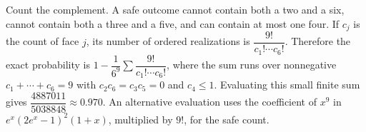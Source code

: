 Count the complement. A safe outcome cannot contain both a two and a six, cannot contain both a three and a five, and can contain at most one four. If $c_j$ is the count of face $j$, its number of ordered realizations is $\dfrac{9!}{c_1!\cdots c_6!}$. Therefore the exact probability is $1-\dfrac{1}{6^9}\sum\dfrac{9!}{c_1!\cdots c_6!}$, where the sum runs over nonnegative $c_1+\cdots+c_6=9$ with $c_2c_6=c_3c_5=0$ and $c_4\le1$. Evaluating this small finite sum gives $\dfrac{4887011}{5038848}\approx\boxed{0.970}$. An alternative evaluation uses the coefficient of $x^9$ in $e^x(2e^x-1)^2(1+x)$, multiplied by $9!$, for the safe count.
